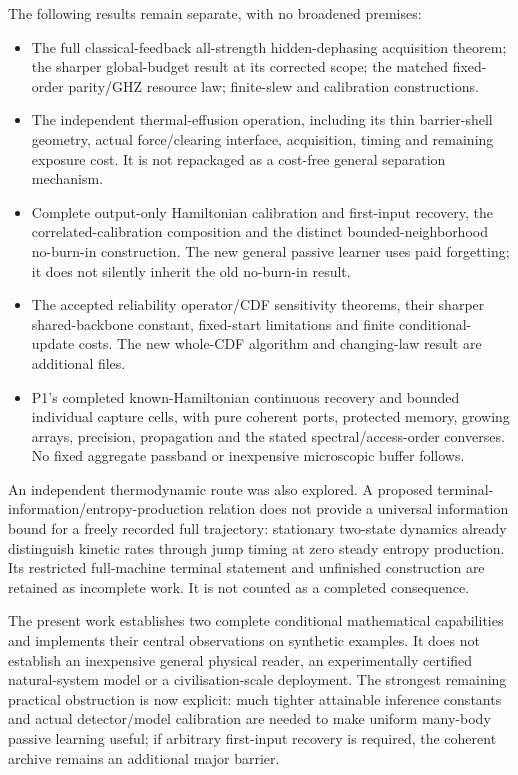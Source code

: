 \documentclass[11pt]{article}
\begin{document}
The following results remain separate, with no broadened premises:
\begin{itemize}
\item The full classical-feedback all-strength hidden-dephasing acquisition theorem; the sharper global-budget result at its corrected scope; the matched fixed-order parity/GHZ resource law; finite-slew and calibration constructions.
\item The independent thermal-effusion operation, including its thin barrier-shell geometry, actual force/clearing interface, acquisition, timing and remaining exposure cost. It is not repackaged as a cost-free general separation mechanism.
\item Complete output-only Hamiltonian calibration and first-input recovery, the correlated-calibration composition and the distinct bounded-neighborhood no-burn-in construction. The new general passive learner uses paid forgetting; it does not silently inherit the old no-burn-in result.
\item The accepted reliability operator/CDF sensitivity theorems, their sharper shared-backbone constant, fixed-start limitations and finite conditional-update costs. The new whole-CDF algorithm and changing-law result are additional files.
\item P1's completed known-Hamiltonian continuous recovery and bounded individual capture cells, with pure coherent ports, protected memory, growing arrays, precision, propagation and the stated spectral/access-order converses. No fixed aggregate passband or inexpensive microscopic buffer follows.
\end{itemize}

An independent thermodynamic route was also explored. A proposed terminal-information/entropy-production relation does not provide a universal information bound for a freely recorded full trajectory: stationary two-state dynamics already distinguish kinetic rates through jump timing at zero steady entropy production. Its restricted full-machine terminal statement and unfinished construction are retained as incomplete work. It is not counted as a completed consequence.

The present work establishes two complete conditional mathematical capabilities and implements their central observations on synthetic examples. It does not establish an inexpensive general physical reader, an experimentally certified natural-system model or a civilisation-scale deployment. The strongest remaining practical obstruction is now explicit: much tighter attainable inference constants and actual detector/model calibration are needed to make uniform many-body passive learning useful; if arbitrary first-input recovery is required, the coherent archive remains an additional major barrier.
\end{document}
